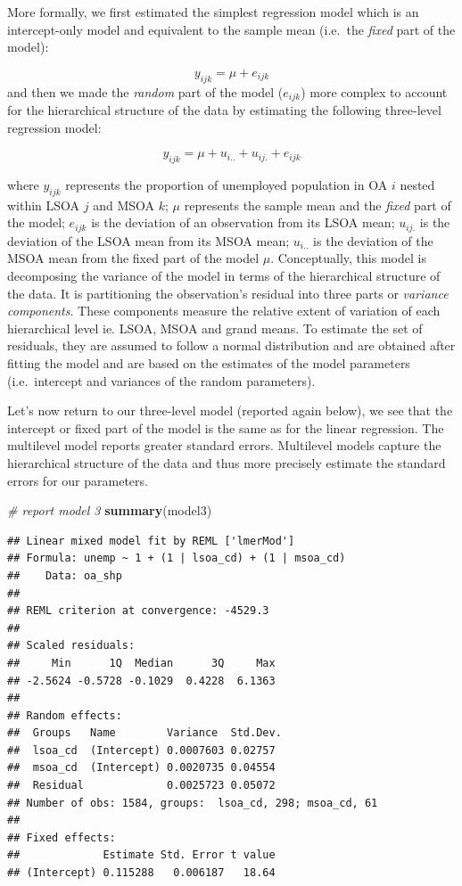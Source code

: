 \documentclass[]{book}
\newenvironment{Shaded}{\begin{snugshade}}{\end{snugshade}}
\newcommand{\KeywordTok}[1]{\textcolor[rgb]{0.13,0.29,0.53}{\textbf{#1}}}
\newcommand{\CommentTok}[1]{\textcolor[rgb]{0.56,0.35,0.01}{\textit{#1}}}
\newcommand{\NormalTok}[1]{#1}
\begin{document}
More formally, we first estimated the simplest regression model which is
an intercept-only model and equivalent to the sample mean (i.e.~the
\emph{fixed} part of the model):

\[y_{ijk} = \mu + e_{ijk}\] and then we made the \emph{random} part of
the model (\(e_{ijk}\)) more complex to account for the hierarchical
structure of the data by estimating the following three-level regression
model:

\[y_{ijk} = \mu + u_{i..} + u_{ij.} + e_{ijk}\]

where \(y_{ijk}\) represents the proportion of unemployed population in
OA \(i\) nested within LSOA \(j\) and MSOA \(k\); \(\mu\) represents the
sample mean and the \emph{fixed} part of the model; \(e_{ijk}\) is the
deviation of an observation from its LSOA mean; \(u_{ij.}\) is the
deviation of the LSOA mean from its MSOA mean; \(u_{i..}\) is the
deviation of the MSOA mean from the fixed part of the model \(\mu\).
Conceptually, this model is decomposing the variance of the model in
terms of the hierarchical structure of the data. It is partitioning the
observation's residual into three parts or \emph{variance components}.
These components measure the relative extent of variation of each
hierarchical level ie. LSOA, MSOA and grand means. To estimate the set
of residuals, they are assumed to follow a normal distribution and are
obtained after fitting the model and are based on the estimates of the
model parameters (i.e.~intercept and variances of the random
parameters).

Let's now return to our three-level model (reported again below), we see
that the intercept or fixed part of the model is the same as for the
linear regression. The multilevel model reports greater standard errors.
Multilevel models capture the hierarchical structure of the data and
thus more precisely estimate the standard errors for our parameters.

\begin{Shaded}
\begin{Highlighting}[]
\CommentTok{# report model 3}
\KeywordTok{summary}\NormalTok{(model3)}
\end{Highlighting}
\end{Shaded}

\begin{verbatim}
## Linear mixed model fit by REML ['lmerMod']
## Formula: unemp ~ 1 + (1 | lsoa_cd) + (1 | msoa_cd)
##    Data: oa_shp
## 
## REML criterion at convergence: -4529.3
## 
## Scaled residuals: 
##     Min      1Q  Median      3Q     Max 
## -2.5624 -0.5728 -0.1029  0.4228  6.1363 
## 
## Random effects:
##  Groups   Name        Variance  Std.Dev.
##  lsoa_cd  (Intercept) 0.0007603 0.02757 
##  msoa_cd  (Intercept) 0.0020735 0.04554 
##  Residual             0.0025723 0.05072 
## Number of obs: 1584, groups:  lsoa_cd, 298; msoa_cd, 61
## 
## Fixed effects:
##             Estimate Std. Error t value
## (Intercept) 0.115288   0.006187   18.64
\end{verbatim}
\end{document}
